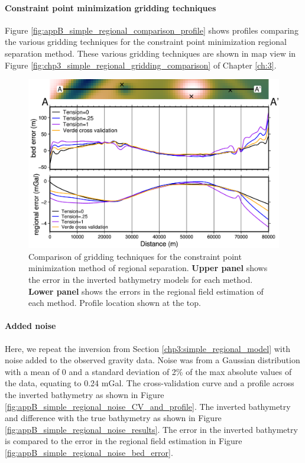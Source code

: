 \paragraph*{Constraint point minimization gridding techniques}

Figure \ref{fig:appB_simple_regional_comparison_profile} shows profiles comparing the various gridding techniques for the constraint point minimization regional separation method. These various gridding techniques are shown in map view in Figure \ref{fig:chp3_simple_regional_gridding_comparison} of Chapter \ref{ch:3}.

\begin{figure}[!ht]
    \centering
    \includegraphics[width=.95\textwidth]{figures/chp3/chp3_simple_regional_gridding_comparison_profiles.png}
    \caption[Constraint point minimization gridding comparison profiles]{Comparison of gridding techniques for the constraint point minimization method of regional separation. \textbf{Upper panel} shows the error in the inverted bathymetry models for each method. \textbf{Lower panel} shows the errors in the regional field estimation of each method. Profile location shown at the top.}
    \label{fig:appB_simple_regional_gridding_comparison_profile}
\end{figure}

\paragraph*{Added noise}

Here, we repeat the inversion from Section \ref{chp3:simple_regional_model} with noise added to the observed gravity data. Noise was from a Gaussian distribution with a mean of 0 and a standard deviation of 2\% of the max absolute values of the data, equating to 0.24 mGal. The cross-validation curve and a profile across the inverted bathymetry as shown in Figure \ref{fig:appB_simple_regional_noise_CV_and_profile}. The inverted bathymetry and difference with the true bathymetry as shown in Figure \ref{fig:appB_simple_regional_noise_results}. The error in the inverted bathymetry is compared to the error in the regional field estimation in Figure \ref{fig:appB_simple_regional_noise_bed_error}.

